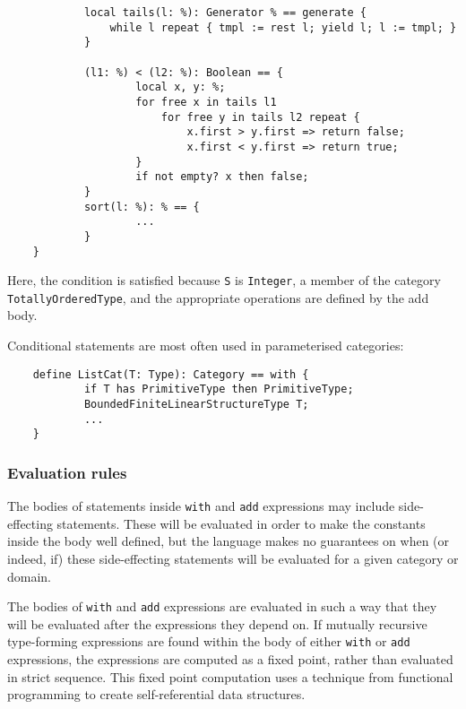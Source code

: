 {\begin{small}
\begin{verbatim}
            local tails(l: %): Generator % == generate {
                while l repeat { tmpl := rest l; yield l; l := tmpl; }
            }

            (l1: %) < (l2: %): Boolean == {
                    local x, y: %;
                    for free x in tails l1 
                        for free y in tails l2 repeat {
                            x.first > y.first => return false;
                            x.first < y.first => return true;
                    }
                    if not empty? x then false;
            }
            sort(l: %): % == {
                    ... 
            }
    }
\end{verbatim}
\end{small}

Here, the condition is satisfied because \verb"S" is \verb"Integer", a
member of the category 
\verb"TotallyOrderedType", and the appropriate operations are defined by the add
body.

Conditional statements are most often used in parameterised categories: 

\begin{small}
\begin{verbatim}
    define ListCat(T: Type): Category == with {
            if T has PrimitiveType then PrimitiveType;
            BoundedFiniteLinearStructureType T;
            ...
    }
\end{verbatim}
\end{small}

\subsubsection{Evaluation rules}

The bodies of  statements inside {\tt with} and {\tt add}
expressions may include side-effecting statements. These will
be evaluated in order to make the constants inside the body well
defined, but the language makes no guarantees on when (or indeed, if)
these side-effecting statements will be evaluated for a given category
or domain.

The bodies of {\tt with} and {\tt add} expressions are evaluated in such
a way that they will be evaluated after the expressions they depend
on.  If mutually recursive type-forming expressions are found within
the body of either {\tt with} or {\tt add} expressions, the
expressions are computed as a fixed point, rather than evaluated in
strict sequence.  This fixed point computation uses a technique from
functional programming to create self-referential data structures.

}
